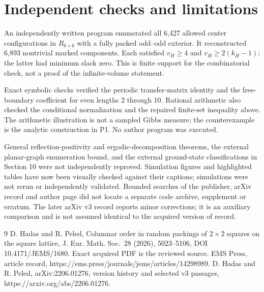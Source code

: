 \documentclass[10pt]{article}
\begin{document}
\section*{Independent checks and limitations}
An independently written program enumerated all 6,427 allowed center configurations in \(R_{6\times6}\) with a fully packed odd–odd exterior. It reconstructed 6,893 nontrivial marked components. Each satisfied \(v_H\geq4\) and \(v_H\geq2(k_H-1)\); the latter had minimum slack zero. This is finite support for the combinatorial check, not a proof of the infinite-volume statement.\par
Exact symbolic checks verified the periodic transfer-matrix identity and the free-boundary coefficient for even lengths 2 through 10. Rational arithmetic also checked the conditional normalization and the repaired finite-set inequality above. The arithmetic illustration is not a sampled Gibbs measure; the counterexample is the analytic construction in P1. No author program was executed.\par
General reflection-positivity and ergodic-decomposition theorems, the external planar-graph enumeration bound, and the external ground-state classifications in Section 10 were not independently reproved. Simulation figures and highlighted tables have now been visually checked against their captions; simulations were not rerun or independently validated. Bounded searches of the publisher, arXiv record and author page did not locate a separate code archive, supplement or erratum. The later arXiv v3 record reports minor corrections; it is an auxiliary comparison and is not assumed identical to the acquired version of record.\par
9 D. Hadas and R. Peled, Columnar order in random packings of \(2\times2\) squares on the square lattice, J. Eur. Math. Soc. 28 (2026), 5023–5106, DOI 10.4171/JEMS/1680. Exact acquired PDF is the reviewed source. EMS Press, article record, https://ems.press/journals/jems/articles/14298989. D. Hadas and R. Peled, arXiv:2206.01276, version history and selected v3 passages, https://arxiv.org/abs/2206.01276.\par
\end{document}
